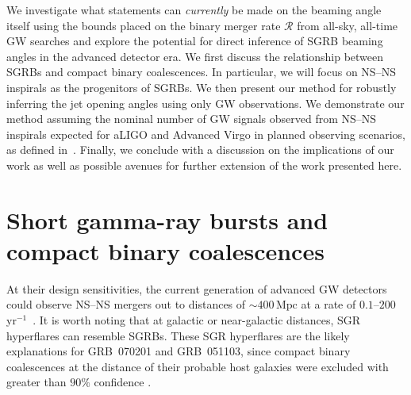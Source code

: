 \documentclass[twocolumn]{aastex61}
\newcommand{\cbcrate}{{{\mathcal R}}}
\newcommand{\mpc}{\mathrm{Mpc}}
\newcommand{\BNS}{\ac{NS}--\ac{NS}\xspace}
\begin{document}
We investigate what statements can \emph{currently} be made on the beaming angle
itself using the bounds placed on the binary merger rate $\cbcrate$ from
all-sky, all-time \ac{GW} searches and explore the potential for direct
inference of \ac{SGRB} beaming angles in the advanced detector era.
We first discuss the relationship between \acp{SGRB} and compact binary
coalescences. In particular, we will focus on \BNS inspirals as the progenitors
of \acp{SGRB}. We then present our method for robustly inferring the jet opening
angles using only \ac{GW} observations. We demonstrate our method assuming the
nominal number of \ac{GW} signals observed from \BNS inspirals expected for
\ac{aLIGO} and Advanced Virgo in planned observing scenarios, as defined
in~\cite{Aasi:2013wya}. Finally, we conclude with a discussion on the
implications of our work as well as possible avenues for further extension of
the work presented here.


\section{Short gamma-ray bursts and compact binary coalescences}
\label{sec:sgrbs}
At their design sensitivities, the current generation of advanced
\ac{GW} detectors could observe \BNS mergers out to distances of
${\sim}400\,\mpc$ at a rate of $0.1\text{--}200\,$yr$^{-1}$~\cite{Aasi:2013wya}.
It is worth noting that at galactic or near-galactic distances, \ac{SGR}
hyperflares can resemble \acp{SGRB}. These \ac{SGR} hyperflares are the likely
explanations for GRB~070201 and GRB~051103, since compact binary coalescences at
the distance of their probable host galaxies were excluded with
greater than $90\%$ confidence \cite{Abbott:2007rh,Abadie:2012bz}.
\end{document}
